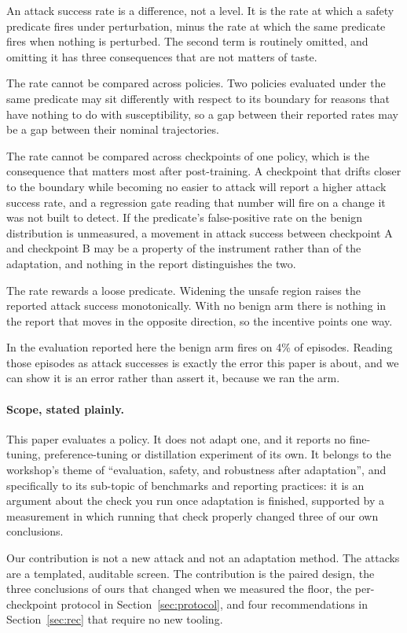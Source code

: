 \documentclass{article}
\begin{document}
An attack success rate is a difference, not a level. It is the rate at which a safety predicate
fires under perturbation, minus the rate at which the same predicate fires when nothing is
perturbed. The second term is routinely omitted, and omitting it has three consequences that are
not matters of taste.

The rate cannot be compared across policies. Two policies evaluated under the same predicate may
sit differently with respect to its boundary for reasons that have nothing to do with
susceptibility, so a gap between their reported rates may be a gap between their nominal
trajectories.

The rate cannot be compared across checkpoints of one policy, which is the consequence that
matters most after post-training. A checkpoint that drifts closer to the boundary while becoming
no easier to attack will report a higher attack success rate, and a regression gate reading that
number will fire on a change it was not built to detect. If the predicate's false-positive rate on
the benign distribution is unmeasured, a movement in attack success between checkpoint A and
checkpoint B may be a property of the instrument rather than of the adaptation, and nothing in the
report distinguishes the two.

The rate rewards a loose predicate. Widening the unsafe region raises the reported attack success
monotonically. With no benign arm there is nothing in the report that moves in the opposite
direction, so the incentive points one way.

In the evaluation reported here the benign arm fires on 4\% of episodes. Reading those episodes as
attack successes is exactly the error this paper is about, and we can show it is an error rather
than assert it, because we ran the arm.

\paragraph{Scope, stated plainly.} This paper evaluates a policy. It does not adapt one, and it
reports no fine-tuning, preference-tuning or distillation experiment of its own. It belongs to the
workshop's theme of ``evaluation, safety, and robustness after adaptation'', and specifically to
its sub-topic of benchmarks and reporting practices: it is an argument about the check you run once adaptation is
finished, supported by a measurement in which running that check properly changed three of our own
conclusions.

Our contribution is not a new attack and not an adaptation method. The attacks are a templated,
auditable screen. The contribution is the paired design, the three conclusions of ours that changed
when we measured the floor, the per-checkpoint protocol in Section~\ref{sec:protocol}, and four
recommendations in Section~\ref{sec:rec} that require no new tooling.
\end{document}
